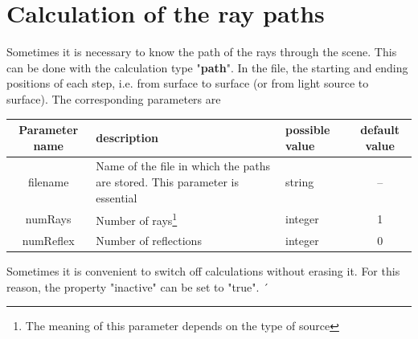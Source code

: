 \documentclass[a4paper,html,11pt,openany]{book}
\begin{document}
 \section{Calculation of the ray paths}
 Sometimes it is necessary to know the path of the rays through the scene. This can be done with the calculation type "{\bf path}". In the file, the starting and ending positions of each step, i.e. from surface to surface (or from light source to surface).
 The corresponding parameters are
 
 \vspace{1em}
 \begin{table}[h!]
\fontsize{10pt}{10pt}\selectfont
 \begin{tabular}{c|m{3cm}|m{3cm}|c}
  Parameter name & description  & possible value & default value \\
 \hline
 filename & Name of the file in which the paths are stored. This parameter is essential & string & -- \\
 \hline 
 numRays & Number of rays\footnote{The meaning of this parameter depends on the type of source} & integer & 1 \\
 \hline 
 numReflex & Number of reflections & integer & 0 \\
 \hline 
 \end{tabular}
   \end{table}
   Sometimes it is convenient to switch off calculations without erasing it. For this reason, the property "inactive" can be set to "true". ´ 
\end{document}
